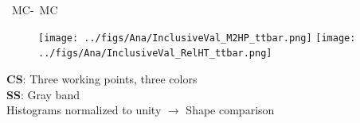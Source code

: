 \begin{frame}{\ttbar~MC-\ttbar~MC}
\vspace{-.2cm}
\begin{figure}[!Hhtbp]
  \begin{center}
    \texttt{[image: ../figs/Ana/InclusiveVal\_M2HP\_ttbar.png]}
    \texttt{[image: ../figs/Ana/InclusiveVal\_RelHT\_ttbar.png]}
  \end{center}
\end{figure}

\vspace{-.2cm}
    \begin{block}{}\scriptsize
      \textbf{CS}: Three working points, three colors\\
      \textbf{SS}: Gray band\\
      Histograms normalized to unity $\to$ Shape comparison
    \end{block}

\end{frame}



